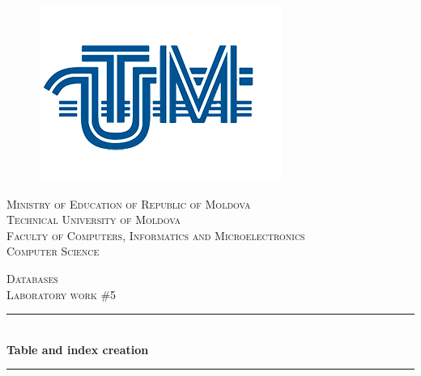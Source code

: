 \begin{titlepage}

  \begin{center} %

\begin{figure}[!h]
	\centering
	\includegraphics[scale=0.35]{logo.png}
\end{figure}

  
  \textsc{\large Ministry of Education of Republic of Moldova}\\[0.5cm]
  \textsc{\large Technical University of Moldova}\\[0.5cm]
  \textsc{\large Faculty of Computers, Informatics and Microelectronics}\\[0.5cm]
  \textsc{\large Computer Science}\\[0.5cm]
  \vspace{20 mm}

  \textsc{\Large Databases}\\[0.5cm] %
  \textsc{\large Laboratory work \#5}\\[0.5cm] %

\newcommand{\HRule}{\rule{\linewidth}{0.5mm}} %

  \vspace{5 mm}
  \HRule \\[0.4cm]
  { \LARGE \bfseries Table and index creation}\\[0.4cm] %
  \HRule \\[1.5cm]


\end{center}
\end{titlepage}

